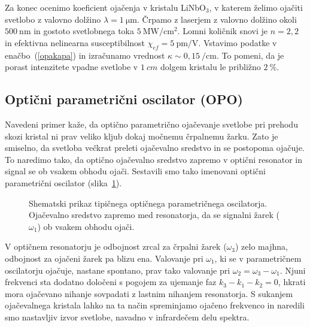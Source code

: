 Za konec ocenimo koeficient ojačenja v kristalu 
LiNbO$_{3}$, v katerem želimo
ojačiti svetlobo z valovno dolžino $\lambda = 1~\si{\micro\metre}$. Črpamo z laserjem z 
valovno dolžino okoli $500~\si{\nano\metre}$ in gostoto svetlobnega 
toka $5~\si{\mega\watt}/\si{\centi\metre}^{2}$. Lomni količnik snovi je 
$n = 2,2$ in efektivna nelinearna susceptibilnost  $\chi_{ef} = 5~\si{\pico\metre}/\si{\volt}$. 
Vstavimo podatke v enačbo~(\ref{opakapa}) in izračunamo vrednost 
$\kappa \sim 0,15~/\si{\centi\metre}$. To pomeni, da je porast intenzitete vpadne svetlobe v $1~\si{cm}$ 
dolgem kristalu le približno $2~\%$. 

\subsection*{Optični parametrični oscilator (OPO)}

Navedeni primer kaže, da optično parametrično ojačevanje svetlobe pri prehodu skozi kristal ni prav veliko
kljub dokaj močnemu črpalnemu žarku. Zato je smiselno, da svetloba večkrat preleti
ojačevalno sredstvo in se postopoma ojačuje. To naredimo tako, 
da optično ojačevalno sredstvo zapremo v optični 
resonator
in signal se ob vsakem obhodu ojači. Sestavili smo tako imenovani optični parametrični oscilator
(slika~\ref{fig:opo}). 
\begin{figure}[ht]
\centering
\def\svgwidth{80truemm} 

\caption{Shematski prikaz tipičnega optičnega parametričnega oscilatorja. Ojačevalno sredstvo
zapremo med resonatorja, da se signalni žarek ($\omega_1$) ob vsakem obhodu ojači.}
\label{fig:opo}
\end{figure}

V optičnem resonatorju je odbojnost zrcal za črpalni žarek ($\omega_3$) zelo majhna, 
odbojnost za ojačeni žarek pa blizu ena. Valovanje pri $\omega_1$,
ki se v parametričnem oscilatorju ojačuje, nastane spontano, prav tako valovanje pri 
$\omega_2 = \omega_3 -\omega_1$. Njuni frekvenci sta dodatno določeni s pogojem za 
ujemanje faz $ k_3 - k_1 - k_2 = 0$, 
hkrati mora ojačevano nihanje sovpadati z lastnim nihanjem resonatorja. 
S sukanjem ojačevalnega kristala lahko na ta način spreminjamo
ojačeno frekvenco in naredili smo nastavljiv izvor svetlobe, navadno v 
infrardečem delu spektra.
\pagebreak

